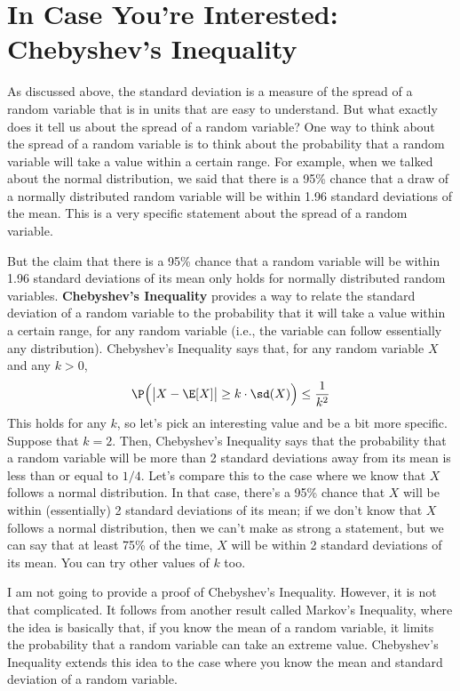 \documentclass[
  letterpaper,
  DIV=11,
  numbers=noendperiod]{scrreprt}
\begin{document}
\section{In Case You're Interested: Chebyshev's
Inequality}\label{in-case-youre-interested-chebyshevs-inequality}

As discussed above, the standard deviation is a measure of the spread of
a random variable that is in units that are easy to understand. But what
exactly does it tell us about the spread of a random variable? One way
to think about the spread of a random variable is to think about the
probability that a random variable will take a value within a certain
range. For example, when we talked about the normal distribution, we
said that there is a 95\% chance that a draw of a normally distributed
random variable will be within 1.96 standard deviations of the mean.
This is a very specific statement about the spread of a random variable.

But the claim that there is a 95\% chance that a random variable will be
within 1.96 standard deviations of its mean only holds for normally
distributed random variables. \textbf{Chebyshev's Inequality} provides a
way to relate the standard deviation of a random variable to the
probability that it will take a value within a certain range, for any
random variable (i.e., the variable can follow essentially any
distribution). Chebyshev's Inequality says that, for any random variable
\(X\) and any \(k > 0\), \begin{align*}
  \P\Big(\big|X - \E[X]\big| \geq k \cdot \sd(X) \Big) \leq \frac{1}{k^2}
\end{align*} This holds for any \(k\), so let's pick an interesting
value and be a bit more specific. Suppose that \(k=2\). Then,
Chebyshev's Inequality says that the probability that a random variable
will be more than 2 standard deviations away from its mean is less than
or equal to \(1/4\). Let's compare this to the case where we know that
\(X\) follows a normal distribution. In that case, there's a 95\% chance
that \(X\) will be within (essentially) 2 standard deviations of its
mean; if we don't know that \(X\) follows a normal distribution, then we
can't make as strong a statement, but we can say that at least 75\% of
the time, \(X\) will be within 2 standard deviations of its mean. You
can try other values of \(k\) too.

I am not going to provide a proof of Chebyshev's Inequality. However, it
is not that complicated. It follows from another result called Markov's
Inequality, where the idea is basically that, if you know the mean of a
random variable, it limits the probability that a random variable can
take an extreme value. Chebyshev's Inequality extends this idea to the
case where you know the mean and standard deviation of a random
variable.
\end{document}
